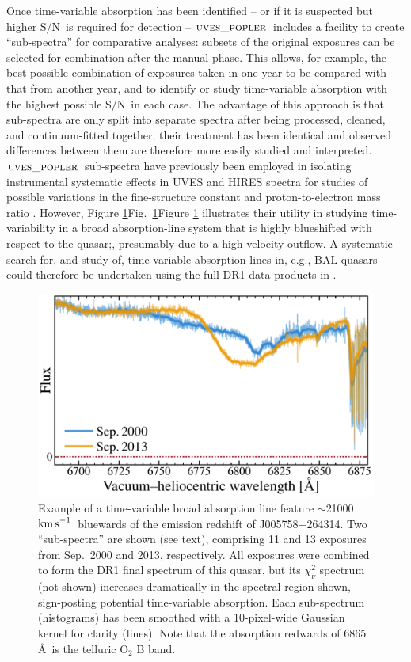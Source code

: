 \documentclass[fleqn,usenatbib,usedcolumn]{mnras}
\newcommand{\Fref}[1]{\ifhmode \ifnum\spacefactor=1001 Figure \ref{#1}\else Fig.\ \ref{#1}\fi \else Figure \ref{#1}\fi}
\newcommand{\kms}{\ensuremath{\textrm{km\,s}^{-1}}}
\newcommand{\SN}{\ensuremath{\textrm{S/N}}}
\newcommand{\popler}{\ensuremath{\textsc{uves\_popler}}}
\begin{document}
Once time-variable absorption has been identified -- or if it is suspected but higher \SN\ is required for detection -- \popler\ includes a facility to create ``sub-spectra'' for comparative analyses: subsets of the original exposures can be selected for combination after the manual phase. This allows, for example, the best possible combination of exposures taken in one year to be compared with that from another year, and to identify or study time-variable absorption with the highest possible \SN\ in each case. The advantage of this approach is that sub-spectra are only split into separate spectra after being processed, cleaned, and continuum-fitted together; their treatment has been identical and observed differences between them are therefore more easily studied and interpreted. \popler\ sub-spectra have previously been employed in isolating instrumental systematic effects in UVES and HIRES spectra for studies of possible variations in the fine-structure constant and proton-to-electron mass ratio \citep[e.g.][]{Dapra:2015:489,Murphy:2016:2461,Murphy:2017:4930}. However, \Fref{f:broadCIV} illustrates their utility in studying time-variability in a broad absorption-line system that is highly blueshifted with respect to the quasar;, presumably due to a high-velocity outflow. A systematic search for, and study of, time-variable absorption lines in, e.g., BAL quasars could therefore be undertaken using the full DR1 data products in \citet[][i.e.\ both the final spectrum and the extracted, contributing exposures]{Murphy:2018:UVESSQUADDR1}.

\begin{figure}
\begin{center}
\includegraphics[width=0.95\columnwidth]{DR1_broadCIV.pdf}
\vspace{-1em}
\caption{Example of a time-variable  broad absorption line feature $\sim$21000\,\kms\ bluewards of the emission redshift of J005758$-$264314. Two ``sub-spectra'' are shown (see text), comprising 11 and 13 exposures from Sep.\ 2000 and 2013, respectively. All exposures were combined to form the DR1 final spectrum of this quasar, but its $\chi^2_\nu$ spectrum (not shown) increases dramatically in the spectral region shown, sign-posting potential time-variable absorption. Each sub-spectrum (histograms) has been smoothed with a 10-pixel-wide Gaussian kernel for clarity (lines). Note that the absorption redwards of 6865\,\AA\ is the telluric O$_2$ B band.}
\label{f:broadCIV}
\end{center}
\end{figure}
\end{document}
